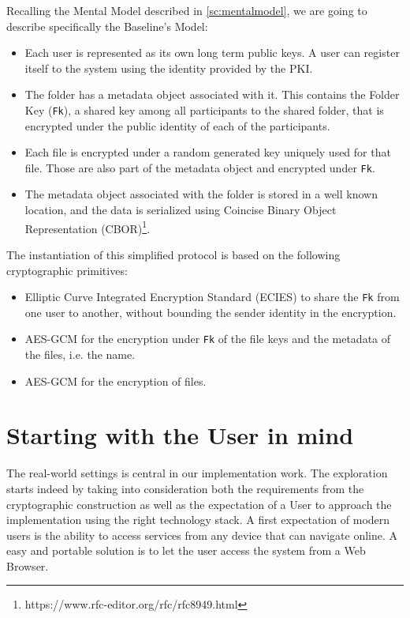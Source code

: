 Recalling the Mental Model described in \cref{sc:mentalmodel}, we are going to describe specifically the Baseline's Model:
\begin{itemize}
    \item Each user is represented as its own long term public keys. A user can register itself to the system using the identity provided by the PKI.
    \item The folder has a metadata object associated with it. This contains the Folder Key (\texttt{Fk}), a shared key among all participants to the shared folder, that is encrypted under the public identity of each of the participants.
    \item Each file is encrypted under a random generated key uniquely used for that file. Those are also part of the metadata object and encrypted under \texttt{Fk}.
    \item The metadata object associated with the folder is stored in a well known location, and the data is serialized using Coincise Binary Object Representation (CBOR)\footnote{https://www.rfc-editor.org/rfc/rfc8949.html}.
\end{itemize}

The instantiation of this simplified protocol is based on the following cryptographic primitives:
\begin{itemize}
    \item Elliptic Curve Integrated Encryption Standard (ECIES) to share the \texttt{Fk} from one user to another, without bounding the sender identity in the encryption.
    \item AES-GCM for the encryption under \texttt{Fk} of the file keys and the metadata of the files, i.e. the name.
    \item AES-GCM for the encryption of files. 
\end{itemize}

\section{Starting with the User in mind} \label{sc:starting-with-the-user}

The real-world settings is central in our implementation work. 
The exploration starts indeed by taking into consideration both the requirements from the cryptographic construction as well as the expectation of a User to approach the implementation using the right technology stack.
A first expectation of modern users is the ability to access services from any device that can navigate online.
A easy and portable solution is to let the user access the system from a Web Browser.


